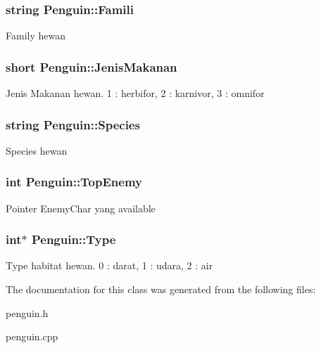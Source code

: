 \subsubsection[{\texorpdfstring{Famili}{Famili}}]{\setlength{\rightskip}{0pt plus 5cm}string Penguin\+::\+Famili\hspace{0.3cm}{\ttfamily [protected]}}\hypertarget{class_penguin_a4ae34d1cbb25aa987ac4d0d0f0dce67b}{}\label{class_penguin_a4ae34d1cbb25aa987ac4d0d0f0dce67b}
Family hewan 
\subsubsection[{\texorpdfstring{Jenis\+Makanan}{JenisMakanan}}]{\setlength{\rightskip}{0pt plus 5cm}short Penguin\+::\+Jenis\+Makanan\hspace{0.3cm}{\ttfamily [protected]}}\hypertarget{class_penguin_a3e98dd2bc19229ea91d92142f8090ec0}{}\label{class_penguin_a3e98dd2bc19229ea91d92142f8090ec0}
Jenis Makanan hewan. 1 \+: herbifor, 2 \+: karnivor, 3 \+: omnifor 
\subsubsection[{\texorpdfstring{Species}{Species}}]{\setlength{\rightskip}{0pt plus 5cm}string Penguin\+::\+Species\hspace{0.3cm}{\ttfamily [protected]}}\hypertarget{class_penguin_ad19d4f413cdf9c6ace26c22c297ff380}{}\label{class_penguin_ad19d4f413cdf9c6ace26c22c297ff380}
Species hewan 
\subsubsection[{\texorpdfstring{Top\+Enemy}{TopEnemy}}]{\setlength{\rightskip}{0pt plus 5cm}int Penguin\+::\+Top\+Enemy\hspace{0.3cm}{\ttfamily [protected]}}\hypertarget{class_penguin_ad81b1b20d241e88c8c4b543310e90fc4}{}\label{class_penguin_ad81b1b20d241e88c8c4b543310e90fc4}
Pointer Enemy\+Char yang available 
\subsubsection[{\texorpdfstring{Type}{Type}}]{\setlength{\rightskip}{0pt plus 5cm}int$\ast$ Penguin\+::\+Type\hspace{0.3cm}{\ttfamily [protected]}}\hypertarget{class_penguin_a74437f8222cbc7957765d5b75647ff4d}{}\label{class_penguin_a74437f8222cbc7957765d5b75647ff4d}
Type habitat hewan. 0 \+: darat, 1 \+: udara, 2 \+: air 

The documentation for this class was generated from the following files\+:\begin{DoxyCompactItemize}
\item 
penguin.\+h\item 
penguin.\+cpp\end{DoxyCompactItemize}
